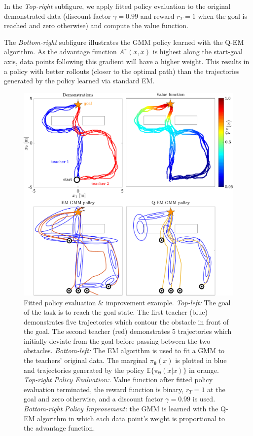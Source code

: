 \documentclass[final,5p,times,twocolumn]{elsarticle}
\newcommand{\X}{x}
\newcommand{\U}{\dot{x}}
\newcommand{\Param}{\boldsymbol{\theta}}
\begin{document}
In the \textit{Top-right} subfigure, we apply fitted policy evaluation to the original demonstrated data (discount 
factor $\gamma=0.99$ and reward $r_{T}=1$ when the goal is reached and zero otherwise) and compute the value function.

The \textit{Bottom-right} subfigure illustrates the GMM policy learned with the Q-EM algorithm. As 
the advantage function $ A^{\pi}(\X,\U)$ is highest along the start-goal axis, data points
following this gradient will have a higher weight. This results in a policy with better 
rollouts (closer to the optimal path) than the trajectories generated by the policy learned via standard EM. 

\begin{figure}
 \centering
 \setlength\fboxsep{0pt}
  \setlength\fboxrule{0.25pt}
  \includegraphics[width=\linewidth]{./Figure/fpe_example.pdf}
 \caption{Fitted policy evaluation \& improvement example. 
  \textit{Top-left:} The goal of the task is to reach the goal state. The first teacher (blue) demonstrates 
  five trajectories which contour the obstacle in front of the goal. The second teacher (red) demonstrates 
  5 trajectories which initially deviate from the goal before passing between the two obstacles. 
  \textit{Bottom-left:} The EM algorithm is used to fit a GMM to the teachers' original data. 
  The marginal $\pi_{\Param}(\X)$ is plotted in blue and trajectories generated by the 
  policy $\mathbb{E}\{\pi_{\Param}(\U|\X)\}$ in orange. \textit{Top-right} \textit{Policy Evaluation:}.  
  Value function after fitted policy evaluation terminated, the reward function 
  is binary, $r_T=1$ at the goal and zero otherwise, and a discount factor $\gamma = 0.99$ is used.
  \textit{Bottom-right} \textit{Policy Improvement:} the GMM is learned with the Q-EM algorithm in which 
  each data point's weight is proportional to the advantage function.
 }
  \label{fig:fpe_example}
\end{figure}
\end{document}
